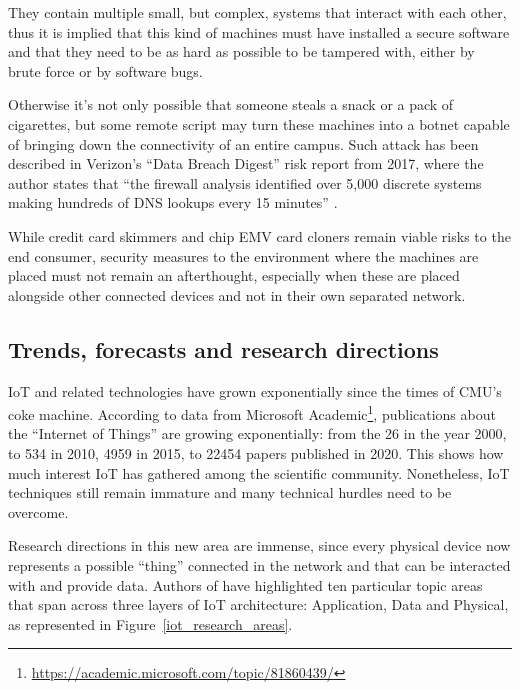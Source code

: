 		They contain multiple small, but complex, systems that interact with each other, thus it is implied that this kind of machines must have installed a secure software and that they need to be as hard as possible to be tampered with, either by brute force or by software bugs.
			
		Otherwise it's not only possible that someone steals a snack or a pack of cigarettes, but some remote script may turn these machines into a botnet capable of bringing down the connectivity of an entire campus.
		Such attack has been described in Verizon's ``Data Breach Digest'' risk report from 2017, where the author states that ``the firewall analysis identified over 5,000 discrete systems making hundreds of DNS lookups every 15 minutes'' \cite{DataBreachDigest}.
		
		While credit card skimmers and chip EMV card cloners remain viable risks to the end consumer, security measures to the environment where the machines are placed must not remain an afterthought, especially when these are placed alongside other connected devices and not in their own separated network.



	\newpage
	\subsection{Trends, forecasts and research directions}

		IoT and related technologies have grown exponentially since the times of CMU's coke machine.
		According to data from Microsoft Academic\footnote{\url{https://academic.microsoft.com/topic/81860439/}}, publications about the ``Internet of Things'' are growing exponentially: from the 26 in the year 2000, to 534 in 2010, 4959 in 2015, to 22454 papers published in 2020.
		This shows how much interest IoT has gathered among the scientific community. Nonetheless,
		IoT techniques still remain immature and many technical hurdles need to be overcome.

		Research directions in this new area are immense, since every physical device now represents a possible ``thing'' connected in the network and that can be interacted with and provide data.
		Authors of \cite{9319033} have highlighted ten particular topic areas that span across three layers of IoT architecture: Application, Data and Physical, as represented in Figure~\ref{iot_research_areas}.
	
